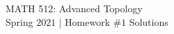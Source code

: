 \begin{center}

{\Large MATH 512: Advanced Topology \\[0ex]
Spring $2021$ | Homework $\#1$ Solutions}
\end{center}

\vspace{0.1in}





\bracketedpoints


